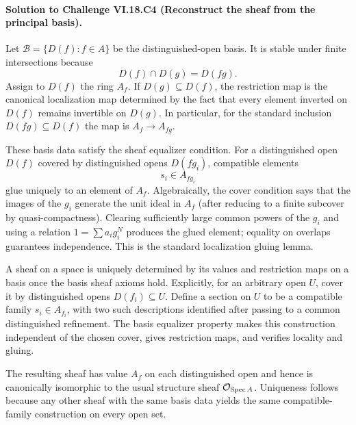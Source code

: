 \paragraph{Solution to Challenge VI.18.C4 (Reconstruct the sheaf from the principal basis).}
\begin{solution}
Let $\mathcal B=\{D(f):f\in A\}$ be the distinguished-open basis. It is stable under finite intersections because
\[
D(f)\cap D(g)=D(fg).
\]
Assign to $D(f)$ the ring $A_f$. If $D(g)\subseteq D(f)$, the restriction map is the canonical localization map determined by the fact that every element inverted on $D(f)$ remains invertible on $D(g)$. In particular, for the standard inclusion $D(fg)\subseteq D(f)$ the map is $A_f\to A_{fg}$.

These basis data satisfy the sheaf equalizer condition. For a distinguished open $D(f)$ covered by distinguished opens $D(fg_i)$, compatible elements
\[
s_i\in A_{fg_i}
\]
glue uniquely to an element of $A_f$. Algebraically, the cover condition says that the images of the $g_i$ generate the unit ideal in $A_f$ (after reducing to a finite subcover by quasi-compactness). Clearing sufficiently large common powers of the $g_i$ and using a relation $1=\sum a_ig_i^N$ produces the glued element; equality on overlaps guarantees independence. This is the standard localization gluing lemma.

A sheaf on a space is uniquely determined by its values and restriction maps on a basis once the basis sheaf axioms hold. Explicitly, for an arbitrary open $U$, cover it by distinguished opens $D(f_i)\subseteq U$. Define a section on $U$ to be a compatible family $s_i\in A_{f_i}$, with two such descriptions identified after passing to a common distinguished refinement. The basis equalizer property makes this construction independent of the chosen cover, gives restriction maps, and verifies locality and gluing.

The resulting sheaf has value $A_f$ on each distinguished open and hence is canonically isomorphic to the usual structure sheaf $\mathcal O_{\operatorname{Spec} A}$. Uniqueness follows because any other sheaf with the same basis data yields the same compatible-family construction on every open set.
\end{solution}

